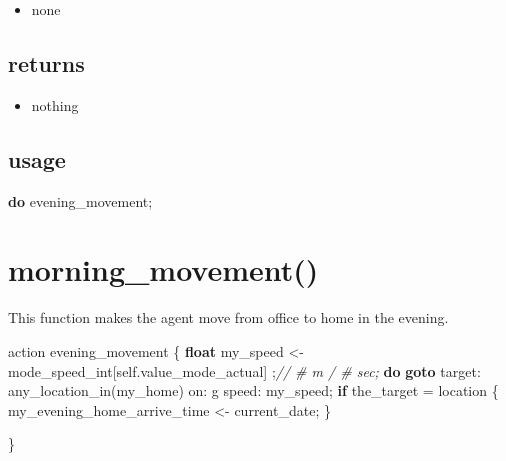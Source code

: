 \documentclass[]{book}
\newenvironment{Shaded}{\begin{snugshade}}{\end{snugshade}}
\newcommand{\CommentTok}[1]{\textcolor[rgb]{0.56,0.35,0.01}{\textit{#1}}}
\newcommand{\KeywordTok}[1]{\textcolor[rgb]{0.13,0.29,0.53}{\textbf{#1}}}
\newcommand{\NormalTok}[1]{#1}
\newcommand{\OtherTok}[1]{\textcolor[rgb]{0.56,0.35,0.01}{#1}}
\providecommand{\tightlist}{%
  \setlength{\itemsep}{0pt}\setlength{\parskip}{0pt}}
\theoremstyle{definition}
\theoremstyle{definition}
\theoremstyle{definition}
\theoremstyle{remark}
\begin{document}
\begin{itemize}
\tightlist
\item
  none
\end{itemize}

\hypertarget{returns-1}{%
\subsection*{returns}\label{returns-1}}

\begin{itemize}
\tightlist
\item
  nothing
\end{itemize}

\hypertarget{usage-1}{%
\subsection*{usage}\label{usage-1}}

\begin{Shaded}
\begin{Highlighting}[]

\KeywordTok{do}\NormalTok{ evening_movement}\OtherTok{;}
\end{Highlighting}
\end{Shaded}

\hypertarget{morning_movement}{%
\section{morning\_movement()}\label{morning_movement}}

This function makes the agent move from office to home in the evening.

\begin{Shaded}
\begin{Highlighting}[]
\NormalTok{action evening_movement}
\NormalTok{    \{}
        \KeywordTok{float}\NormalTok{ my_speed <- mode_speed_int}\OtherTok{[}\NormalTok{self.value_mode_actual}\OtherTok{]} \OtherTok{;}\CommentTok{// # m / # sec;}
        \KeywordTok{do} \KeywordTok{goto}\NormalTok{ target: any_location_in}\OtherTok{(}\NormalTok{my_home}\OtherTok{)}\NormalTok{ on: g speed: my_speed}\OtherTok{;}
        \KeywordTok{if}\NormalTok{ the_target = location}
\NormalTok{        \{}
\NormalTok{            my_evening_home_arrive_time <- current_date}\OtherTok{;}
\NormalTok{        \}}

\NormalTok{    \}}
\end{Highlighting}
\end{Shaded}
\end{document}
